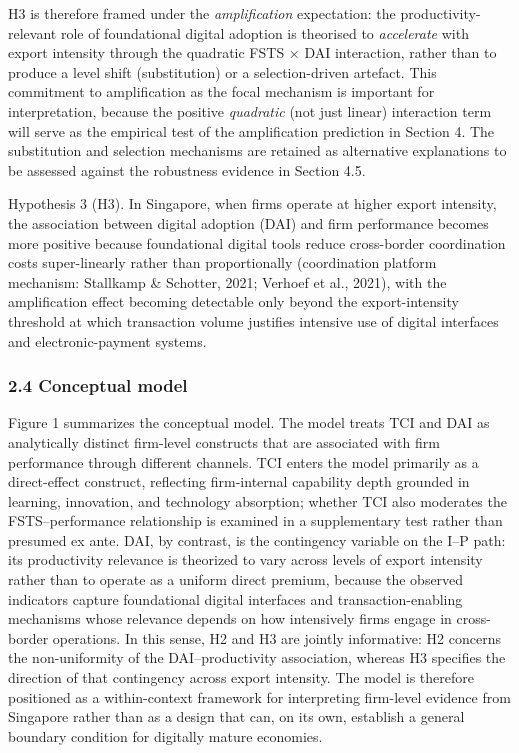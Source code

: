 \documentclass[12pt,a4paper]{article}
\begin{document}
H3 is therefore framed under the \emph{amplification} expectation: the
productivity-relevant role of foundational digital adoption is theorised
to \emph{accelerate} with export intensity through the quadratic FSTS ×
DAI interaction, rather than to produce a level shift (substitution) or
a selection-driven artefact. This commitment to amplification as the
focal mechanism is important for interpretation, because the positive
\emph{quadratic} (not just linear) interaction term will serve as the
empirical test of the amplification prediction in Section 4. The
substitution and selection mechanisms are retained as alternative
explanations to be assessed against the robustness evidence in Section
4.5.

Hypothesis 3 (H3). In Singapore, when firms operate at higher export
intensity, the association between digital adoption (DAI) and firm
performance becomes more positive because foundational digital tools
reduce cross-border coordination costs super-linearly rather than
proportionally (coordination platform mechanism: Stallkamp \& Schotter,
2021; Verhoef et al., 2021), with the amplification effect becoming
detectable only beyond the export-intensity threshold at which
transaction volume justifies intensive use of digital interfaces and
electronic-payment systems.

\hypertarget{24-conceptual-model}{%
\subsubsection{2.4 Conceptual model}\label{24-conceptual-model}}

Figure 1 summarizes the conceptual model. The model treats TCI and DAI
as analytically distinct firm-level constructs that are associated with
firm performance through different channels. TCI enters the model
primarily as a direct-effect construct, reflecting firm-internal
capability depth grounded in learning, innovation, and technology
absorption; whether TCI also moderates the FSTS--performance
relationship is examined in a supplementary test rather than presumed ex
ante. DAI, by contrast, is the contingency variable on the I--P path:
its productivity relevance is theorized to vary across levels of export
intensity rather than to operate as a uniform direct premium, because
the observed indicators capture foundational digital interfaces and
transaction-enabling mechanisms whose relevance depends on how
intensively firms engage in cross-border operations. In this sense, H2
and H3 are jointly informative: H2 concerns the non-uniformity of the
DAI--productivity association, whereas H3 specifies the direction of
that contingency across export intensity. The model is therefore
positioned as a within-context framework for interpreting firm-level
evidence from Singapore rather than as a design that can, on its own,
establish a general boundary condition for digitally mature economies.
\end{document}
